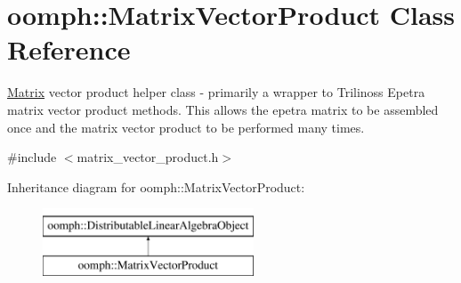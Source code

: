 \hypertarget{classoomph_1_1MatrixVectorProduct}{}\section{oomph\+:\+:Matrix\+Vector\+Product Class Reference}
\label{classoomph_1_1MatrixVectorProduct}


\hyperlink{classoomph_1_1Matrix}{Matrix} vector product helper class -\/ primarily a wrapper to Trilinos\textquotesingle{}s Epetra matrix vector product methods. This allows the epetra matrix to be assembled once and the matrix vector product to be performed many times.  




{\ttfamily \#include $<$matrix\+\_\+vector\+\_\+product.\+h$>$}

Inheritance diagram for oomph\+:\+:Matrix\+Vector\+Product\+:\begin{figure}[H]
\begin{center}
\leavevmode
\includegraphics[height=2.000000cm]{classoomph_1_1MatrixVectorProduct}
\end{center}
\end{figure}
